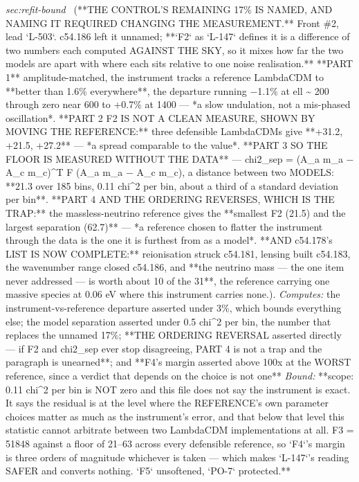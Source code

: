 \begin{description}
\textit{sec:refit-bound} \ (**THE CONTROL'S REMAINING 17\% IS NAMED, AND NAMING IT REQUIRED CHANGING THE MEASUREMENT.** Front \#2, lead `L-503`. c54.186 left it unnamed; **`F2` as `L-147` defines it is a difference of two numbers each computed AGAINST THE SKY, so it mixes how far the two models are apart with where each sits relative to one noise realisation.** **PART 1** amplitude-matched, the instrument tracks a reference LambdaCDM to **better than 1.6\% everywhere**, the departure running \ensuremath{-}1.1\% at ell \textasciitilde{} 200 through zero near 600 to +0.7\% at 1400 --- *a slow undulation, not a mis-phased oscillation*. **PART 2 F2 IS NOT A CLEAN MEASURE, SHOWN BY MOVING THE REFERENCE:** three defensible LambdaCDMs give **+31.2, +21.5, +27.2** --- *a spread comparable to the value*. **PART 3 SO THE FLOOR IS MEASURED WITHOUT THE DATA** --- chi2\_sep = (A\_a m\_a \ensuremath{-} A\_c m\_c)\textasciicircum{}T F (A\_a m\_a \ensuremath{-} A\_c m\_c), a distance between two MODELS: **21.3 over 185 bins, 0.11 chi\textasciicircum{}2 per bin, about a third of a standard deviation per bin**. **PART 4 AND THE ORDERING REVERSES, WHICH IS THE TRAP:** the massless-neutrino reference gives the **smallest F2 (21.5) and the largest separation (62.7)** --- *a reference chosen to flatter the instrument through the data is the one it is furthest from as a model*.  **AND c54.178's LIST IS NOW COMPLETE:** reionisation struck c54.181, lensing built c54.183, the wavenumber range closed c54.186, and **the neutrino mass --- the one item never addressed --- is worth about 10 of the 31**, the reference carrying one massive species at 0.06 eV where this instrument carries none.). 
\emph{Computes:} the instrument-vs-reference departure asserted under 3\%, which bounds everything else; the model separation asserted under 0.5 chi\textasciicircum{}2 per bin, the number that replaces the unnamed 17\%; **THE ORDERING REVERSAL asserted directly --- if F2 and chi2\_sep ever stop disagreeing, PART 4 is not a trap and the paragraph is unearned**; and **F4's margin asserted above 100x at the WORST reference, since a verdict that depends on the choice is not one**
 \emph{Bound:} **scope: 0.11 chi\textasciicircum{}2 per bin is NOT zero and this file does not say the instrument is exact. It says the residual is at the level where the REFERENCE's own parameter choices matter as much as the instrument's error, and that below that level this statistic cannot arbitrate between two LambdaCDM implementations at all. F3 = 51848 against a floor of 21--63 across every defensible reference, so `F4`'s margin is three orders of magnitude whichever is taken --- which makes `L-147`'s reading SAFER and converts nothing. `F5` unsoftened, `PO-7` protected.**

\end{description}
